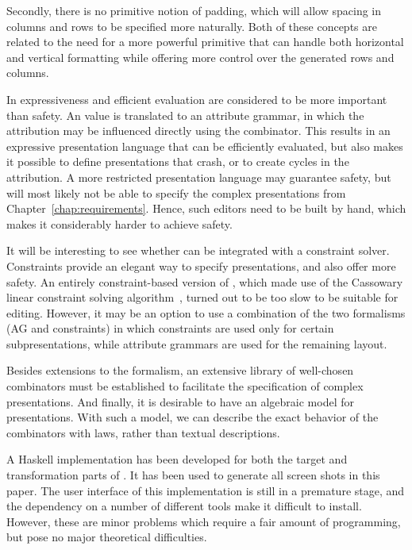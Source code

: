 \bc Secondly, there is no primitive notion of padding, which will allow spacing in columns and rows to be specified more naturally. Both of these concepts are related to the need for a more powerful  primitive that can handle both horizontal and vertical formatting while offering more control over the generated rows and columns. 
\ec

In {\Xprez}  expressiveness and efficient evaluation are considered to be more important than safety. An {\Xprez} value is translated to an attribute grammar, in which the attribution may be influenced directly using the   combinator. This results in an expressive presentation language that can be efficiently evaluated, but also makes it possible to define presentations that crash, or to create cycles in the attribution.  A more restricted presentation language may guarantee safety, but will most likely not be able to specify the complex presentations from Chapter~\ref{chap:requirements}. Hence, such editors need to be built by hand, which makes it considerably harder to achieve safety.


It will be interesting to see whether {\Xprez} can be integrated with a constraint solver. Constraints provide an elegant way to specify presentations, and also offer more safety. An entirely constraint-based version of {\Xprez}, which made use of the Cassowary linear constraint solving algorithm~\cite{badros01cassowary}, turned out to be too slow to be suitable for editing. However, it may be an option to use  a combination of the two formalisms (AG and constraints) in which constraints are used only for certain subpresentations, while attribute grammars are used for the remaining layout.

Besides extensions to the {\Xprez} formalism, an extensive library of well-chosen combinators must be established to facilitate the specification of complex presentations. And finally, it is desirable to have an algebraic model for {\Xprez} presentations. With such a model, we can describe the  exact behavior of the combinators with laws, rather than textual descriptions.



\bc
A Haskell implementation has been developed for both the target and transformation parts of {\Xprez}. It has been used to generate all screen shots in this paper. The user interface of this implementation is still in a premature stage, and the dependency on a number of different tools make it difficult to install. However, these are minor problems which require a fair amount of programming, but pose no major theoretical difficulties. 
\ec

